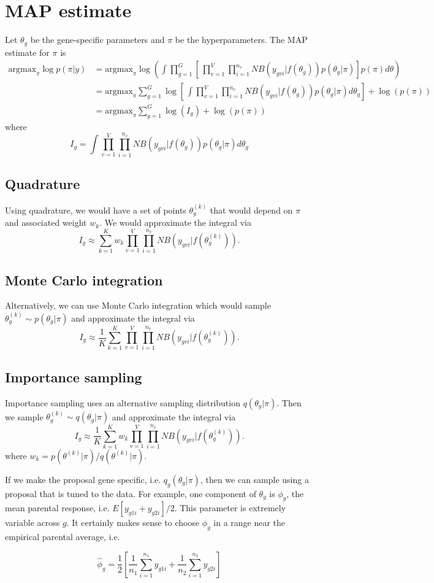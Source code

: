 \documentclass{article}
\newcommand{\argmax}{\mbox{argmax}}
\begin{document}
\section{MAP estimate}

Let $\theta_g$ be the gene-specific parameters and $\pi$ be the hyperparameters. The MAP estimate for $\pi$ is 
\begin{align*}
\argmax_{\pi} \log p(\pi|y) 
&= \argmax_{\pi} \log\left( \int \prod_{g=1}^G \left[ \, \prod_{v=1}^V \prod_{i=1}^{n_v} NB(y_{gvi}|f(\theta_g)) p(\theta_g|\pi) \right] p(\pi) d\theta \right) \\
&= \argmax_{\pi}\sum_{g=1}^G \log \left[ \, \int \prod_{v=1}^V \prod_{i=1}^{n_v} NB(y_{gvi}| f(\theta_g)) p(\theta_g|\pi) d\theta_g  \right] + \log(p(\pi)) \\
&= \argmax_{\pi}\sum_{g=1}^G \log(I_g) + \log(p(\pi)) 
\end{align*}
where 
 \[
 I_g = \int \prod_{v=1}^V \prod_{i=1}^{n_v} NB(y_{gvi}| f(\theta_g)) p(\theta_g|\pi) d\theta_g
 \]

\subsection{Quadrature}

Using quadrature, we would have a set of points $\theta_g^{(k)}$ that would depend on $\pi$ and associated weight $w_k$. We would approximate the integral via 
\[
I_g \approx \sum_{k=1}^K w_k \prod_{v=1}^V \prod_{i=1}^{n_v}  NB(y_{gvi}| f(\theta_g^{(k)})).
\]

\subsection{Monte Carlo integration}

Alternatively, we can use Monte Carlo integration which would sample $\theta_g^{(k)} \sim p(\theta_g|\pi)$ and approximate the integral via 
\[
I_g \approx \frac{1}{K} \sum_{k=1}^K \prod_{v=1}^V \prod_{i=1}^{n_v}  NB(y_{gvi}| f(\theta_g^{(k)})).
\]


\subsection{Importance sampling}

Importance sampling uses an alternative sampling distribution $q(\theta_g|\pi)$. Then we sample $\theta_g^{(k)} \sim q(\theta_g|\pi)$ and approximate the integral via 
\[
I_g \approx \frac{1}{K} \sum_{k=1}^K w_k \prod_{v=1}^V \prod_{i=1}^{n_v} NB(y_{gvi}| f(\theta_g^{(k)})).
\]
where $w_k = p(\theta^{(k)}|\pi)/q(\theta^{(k)}|\pi)$. 

If we make the proposal gene specific, i.e. $q_g(\theta_g|\pi)$, then we can sample using a proposal that is tuned to the data. For example, one component of $\theta_g$ is $\phi_g$, the mean parental response, i.e. $E[y_{g1i}+y_{g2i}]/2$. This parameter is extremely variable across $g$. It certainly makes sense to choose $\phi_g$ in a range near the empirical parental average, i.e. 

\[ \hat{\phi}_g = \frac{1}{2}\left[ \frac{1}{n_1} \sum_{i=1}^{n_1} y_{g1i} + \frac{1}{n_2} \sum_{i=1}^{n_2} y_{g2i} \right] \]
\end{document}
